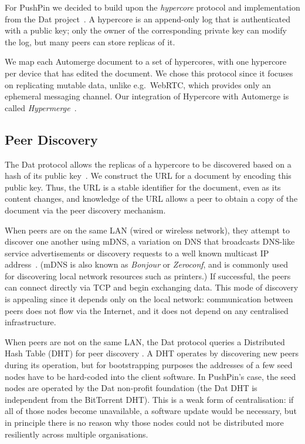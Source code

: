 \documentclass[sigplan,10pt]{acmart}
\begin{document}
For PushPin we decided to build upon the \emph{hypercore} protocol and implementation from the Dat project~\cite{HowDatWorks,Ogden:2018ur}.
A hypercore is an append-only log that is authenticated with a public key; only the owner of the corresponding private key can modify the log, but many peers can store replicas of it.

We map each Automerge document to a set of hypercores, with one hypercore per device that has edited the document.
We chose this protocol since it focuses on replicating mutable data, unlike e.g.\ WebRTC, which provides only an ephemeral messaging channel.
Our integration of Hypercore with Automerge is called \emph{Hypermerge}~\cite{Hypermerge}.



\subsection{Peer Discovery}\label{sec:peer-discovery}

The Dat protocol allows the replicas of a hypercore to be discovered based on a hash of its public key~\cite{HowDatWorks}.
We construct the URL for a document by encoding this public key.
Thus, the URL is a stable identifier for the document, even as its content changes, and knowledge of the URL allows a peer to obtain a copy of the document via the peer discovery mechanism.

When peers are on the same LAN (wired or wireless network), they attempt to discover one another using mDNS, a variation on DNS that broadcasts DNS-like service advertisements or discovery requests to a well known multicast IP address~\cite{ZeroConfBook}.
(mDNS is also known as \emph{Bonjour} or \emph{Zeroconf}, and is commonly used for discovering local network resources such as printers.)
If successful, the peers can connect directly via TCP and begin exchanging data.
This mode of discovery is appealing since it depends only on the local network: communication between peers does not flow via the Internet, and it does not depend on any centralised infrastructure.

When peers are not on the same LAN, the Dat protocol queries a Distributed Hash Table (DHT) for peer discovery \cite{DatPeerDiscovery}. A DHT operates by discovering new peers during its operation, but for bootstrapping purposes the addresses of a few seed nodes have to be hard-coded into the client software. In PushPin's case, the seed nodes are operated by the Dat non-profit foundation (the Dat DHT is independent from the BitTorrent DHT). This is a weak form of centralisation: if all of those nodes become unavailable, a software update would be necessary, but in principle there is no reason why those nodes could not be distributed more resiliently across multiple organisations. 
\end{document}
